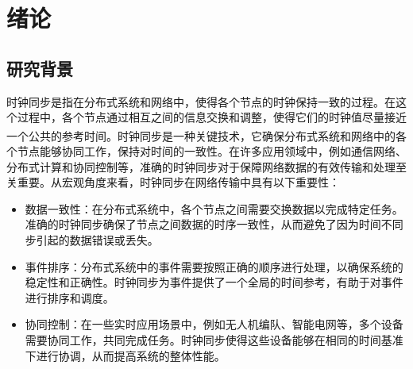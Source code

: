 \documentclass[UTF8,a4paper,12pt]{ctexart}
\numberwithin{equation}{section}
\begin{document}
\newpage
{}
\renewcommand\contentsname{\textbf{目\quad录}}

\begin{center}
{
\tableofcontents
\newpage
\renewcommand\listfigurename{\hfill\textbf{本文插图索引}\hfill}
\listoffigures

\newpage
\renewcommand\listtablename{\hfill\textbf{本文表格索引}\hfill}
\listoftables
\thispagestyle{fancy}
}
\end{center}

\newpage
{}
\section{绪论}
\subsection{研究背景}
时钟同步是指在分布式系统和网络中，使得各个节点的时钟保持一致的过程。在这个过程中，各个节点通过相互之间的信息交换和调整，使得它们的时钟值尽量接近一个公共的参考时间\textsuperscript{\cite{kopetz1987clock}}。时钟同步是一种关键技术，它确保分布式系统和网络中的各个节点能够协同工作，保持对时间的一致性。在许多应用领域中，例如通信网络、分布式计算和协同控制等，准确的时钟同步对于保障网络数据的有效传输和处理至关重要。从宏观角度来看，时钟同步在网络传输中具有以下重要性：
\begin{itemize}
	\item 数据一致性：在分布式系统中，各个节点之间需要交换数据以完成特定任务。准确的时钟同步确保了节点之间数据的时序一致性，从而避免了因为时间不同步引起的数据错误或丢失。
	\item 事件排序：分布式系统中的事件需要按照正确的顺序进行处理，以确保系统的稳定性和正确性。时钟同步为事件提供了一个全局的时间参考，有助于对事件进行排序和调度。
	\item 协同控制：在一些实时应用场景中，例如无人机编队、智能电网等，多个设备需要协同工作，共同完成任务。时钟同步使得这些设备能够在相同的时间基准下进行协调，从而提高系统的整体性能。
\end{itemize}
\end{document}

